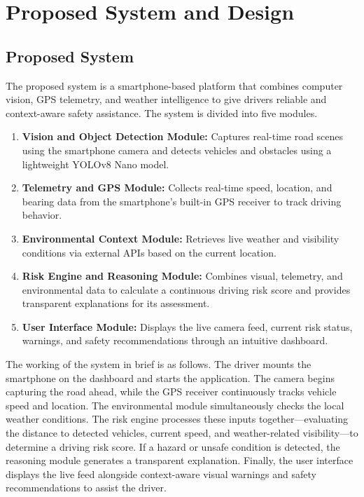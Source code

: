 \chapter{Proposed System and Design}

\section{Proposed System}

The proposed system is a smartphone-based platform that combines computer vision, GPS telemetry, and weather intelligence to give drivers reliable and context-aware safety assistance. The system is divided into five modules.

\begin{enumerate}
    \item \textbf{Vision and Object Detection Module:} Captures real-time road scenes using the smartphone camera and detects vehicles and obstacles using a lightweight YOLOv8 Nano model.
    \item \textbf{Telemetry and GPS Module:} Collects real-time speed, location, and bearing data from the smartphone's built-in GPS receiver to track driving behavior.
    \item \textbf{Environmental Context Module:} Retrieves live weather and visibility conditions via external APIs based on the current location.
    \item \textbf{Risk Engine and Reasoning Module:} Combines visual, telemetry, and environmental data to calculate a continuous driving risk score and provides transparent explanations for its assessment.
    \item \textbf{User Interface Module:} Displays the live camera feed, current risk status, warnings, and safety recommendations through an intuitive dashboard.
\end{enumerate}

The working of the system in brief is as follows. The driver mounts the smartphone on the dashboard and starts the application. The camera begins capturing the road ahead, while the GPS receiver continuously tracks vehicle speed and location. The environmental module simultaneously checks the local weather conditions. The risk engine processes these inputs together---evaluating the distance to detected vehicles, current speed, and weather-related visibility---to determine a driving risk score. If a hazard or unsafe condition is detected, the reasoning module generates a transparent explanation. Finally, the user interface displays the live feed alongside context-aware visual warnings and safety recommendations to assist the driver.

